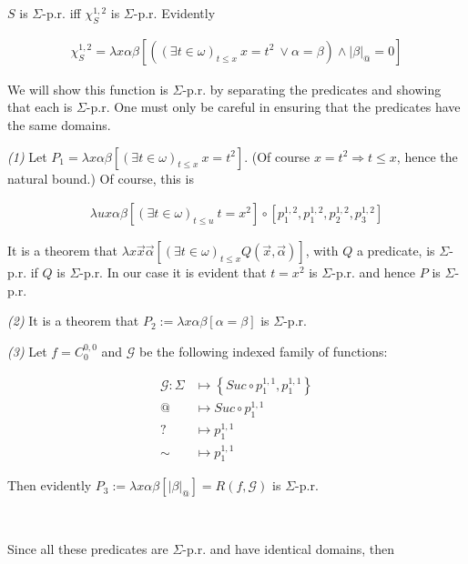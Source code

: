 \documentclass[a4paper, 12pt]{article}
\begin{document}
$S$ is $\Sigma$-p.r. iff $\chi_S^{1, 2}$ is $\Sigma$-p.r. Evidently 

\begin{align*}
    \chi_S^{1, 2} = \lambda x \alpha \beta \left[ \left( (\exists t \in
            \omega)_{t \leq x} ~ x
    = t^2  ~ \lor \alpha = \beta \right) \land |\beta|_{@} = 0 \right]
\end{align*}

We will show this function is $\Sigma$-p.r. by separating the predicates and
showing that each is $\Sigma$-p.r. One must only be careful in ensuring that the
predicates have the same domains.

\textit{(1)} Let $P_1 = \lambda x\alpha\beta \left[ (\exists t \in \omega)_{t
    \leq x} ~ x =
t^2\right]$. (Of course $x = t^2 \Rightarrow t \leq x$, hence the natural
bound.) Of course, this is 

\begin{align*}
    \lambda u x \alpha \beta \left[ (\exists t \in \omega)_{t \leq u} ~ t = x^2
    \right] \circ \left[ p_1^{1, 2}, p_1^{1, 2}, p_2^{1, 2}, p_3^{1, 2} \right] 
\end{align*}

It is a theorem that $\lambda x \vec{x}\vec{\alpha} \left[ (\exists t \in
\omega)_{t \leq x} Q(\vec{x}, \vec{\alpha})   \right]$, with $Q$ a predicate, is
$\Sigma$-p.r. if $Q$ is $\Sigma$-p.r. In our case it is evident that $t = x^2$
is $\Sigma$-p.r. and hence $P$ is $\Sigma$-p.r. 

\textit{(2)} It is a theorem that $P_2 := \lambda x \alpha\beta \left[  \alpha = \beta
\right]$ is $\Sigma$-p.r.  

\textit{(3)} Let $f = C_{0}^{0, 0}$ and $\mathcal{G}$ be the following indexed
family of functions: 

\begin{align*}
    \mathcal{G} : \Sigma &\mapsto \left\{ Suc \circ p_1^{1, 1}, p_1^{1, 1} \right\}  \\ 
    @ &\mapsto Suc \circ p_1^{1, 1} \\ 
    ? &\mapsto p_1^{1, 1} \\ 
    \sim &\mapsto p_1^{1, 1}
\end{align*}

Then evidently $P_3 := \lambda x\alpha\beta \left[ |\beta|_{@}  \right] = R(f,
\mathcal{G})$ is $\Sigma$-p.r. 

~ 

Since all these predicates are $\Sigma$-p.r. and have identical domains, then 
\end{document}
